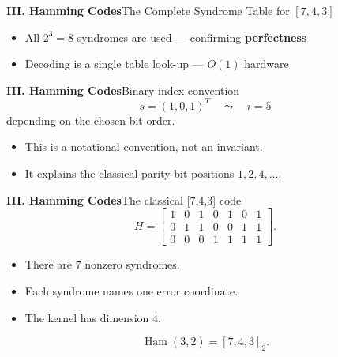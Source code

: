 \begin{frame}{\textbf{III. Hamming Codes}}{The Complete Syndrome Table for $[7,4,3]$}
\begin{center}
\end{center}

\vspace{-2pt}
\begin{itemize}
  \item All $2^3 = 8$ syndromes are used — confirming \textbf{perfectness}
  \item Decoding is a single table look-up — $O(1)$ hardware
\end{itemize}
\end{frame}

\begin{frame}{\textbf{III. Hamming Codes}}{Binary index convention}
\small
{}
\[
  s=(1,0,1)^T\quad\leadsto\quad i=5
\]
depending on the chosen bit order.
\begin{itemize}
  \item This is a notational convention, not an invariant.
  \item It explains the classical parity-bit positions $1,2,4,\ldots$.
\end{itemize}
\end{frame}

\begin{frame}{\textbf{III. Hamming Codes}}{The classical [7,4,3] code}
\small
\[
H=
\begin{bmatrix}
1&0&1&0&1&0&1\\
0&1&1&0&0&1&1\\
0&0&0&1&1&1&1
\end{bmatrix}.
\]
\begin{itemize}
  \item There are $7$ nonzero syndromes.
  \item Each syndrome names one error coordinate.
  \item The kernel has dimension $4$.
\end{itemize}
\[
  \operatorname{Ham}(3,2)=[7,4,3]_2.
\]
\end{frame}

